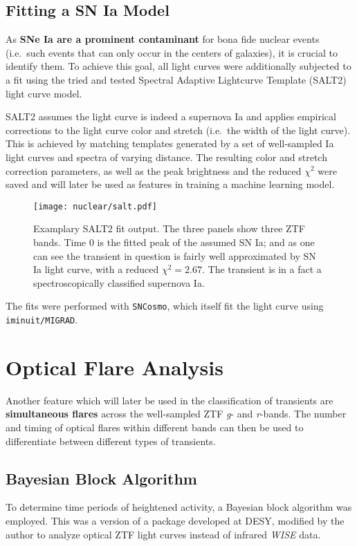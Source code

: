 \subsection{Fitting a SN Ia Model}
As \textbf{SNe Ia are a prominent contaminant} for bona fide nuclear events (i.e.~such events that can only occur in the centers of galaxies), it is crucial to identify them. To achieve this goal, all light curves were additionally subjected to a fit using the tried and tested Spectral Adaptive Lightcurve Template (SALT2)~ light curve model.

SALT2 assumes the light curve is indeed a supernova Ia and applies empirical corrections to the light curve color and stretch (i.e.~the width of the light curve). This is achieved by matching templates generated by a set of well-sampled Ia light curves and spectra of varying distance. The resulting color and stretch correction parameters, as well as the peak brightness and the reduced $\chi^2$ were saved and will later be used as features in training a machine learning model.

\begin{figure}[H]
    \texttt{[image: nuclear/salt.pdf]}
    \caption[SALT2 Fit]{Examplary SALT2 fit output. The three panels show three ZTF bands. Time 0 is the fitted peak of the assumed SN Ia; and as one can see the transient in question is fairly well approximated by SN Ia light curve, with a reduced  $\chi^2=2.67$. The transient is in a fact a spectroscopically classified supernova Ia.}
\end{figure}

The fits were performed with \texttt{SNCosmo}, which itself fit the light curve using \texttt{iminuit/MIGRAD}.

\section{Optical Flare Analysis}
Another feature which will later be used in the classification of transients are \textbf{simultaneous flares} across the well-sampled ZTF \textit{g}- and \textit{r}-bands. The number and timing of optical flares within different bands can then be used to differentiate between different types of transients.

\subsection{Bayesian Block Algorithm}
To determine time periods of heightened activity, a Bayesian block algorithm was employed. This was a version of a package developed at DESY, modified by the author to analyze optical ZTF light curves instead of infrared \textit{WISE} data.

